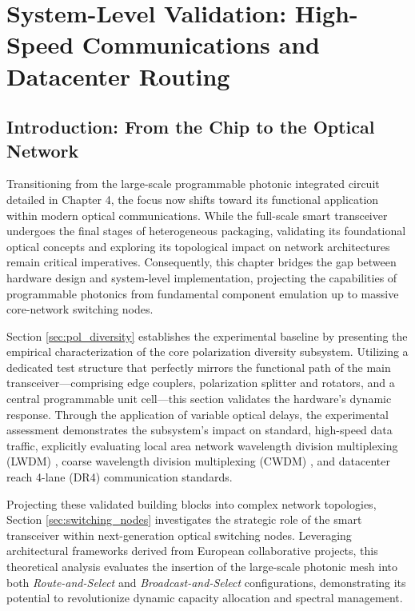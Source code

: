 
\chapter{System-Level Validation: High-Speed Communications and Datacenter Routing}
\label{chap:apps} %

\section{Introduction: From the Chip to the Optical Network}\label{sec:ch5_intro}

Transitioning from the large-scale programmable photonic integrated circuit detailed in Chapter 4, 
the focus now shifts toward its functional application within modern optical communications. While 
the full-scale smart transceiver undergoes the final stages of heterogeneous packaging, validating 
its foundational optical concepts and exploring its topological impact on network architectures 
remain critical imperatives. Consequently, this chapter bridges the gap between hardware design and 
system-level implementation, projecting the capabilities of programmable photonics from fundamental 
component emulation up to massive core-network switching nodes.

Section \ref{sec:pol_diversity} establishes the experimental baseline by presenting the empirical 
characterization of the core polarization diversity subsystem. Utilizing a dedicated test structure 
that perfectly mirrors the functional path of the main transceiver—comprising edge couplers, 
polarization splitter and rotators, and a central programmable unit cell—this section validates the 
hardware's dynamic response. Through the application of variable optical delays, the experimental 
assessment demonstrates the subsystem's impact on standard, high-speed data traffic, explicitly 
evaluating local area network wavelength division multiplexing (LWDM) \cite{ieee_lwdm}, coarse 
wavelength division multiplexing (CWDM) \cite{itut_g694_2}, and datacenter reach 4-lane (DR4) 
\cite{ieee_dr4} communication standards.

Projecting these validated building blocks into complex network topologies, Section 
\ref{sec:switching_nodes} investigates the strategic role of the smart transceiver within 
next-generation optical switching nodes. Leveraging architectural frameworks derived from European 
collaborative projects, this theoretical analysis evaluates the insertion of the large-scale 
photonic mesh into both \textit{Route-and-Select} and \textit{Broadcast-and-Select} configurations, 
demonstrating its potential to revolutionize dynamic capacity allocation and spectral management.


